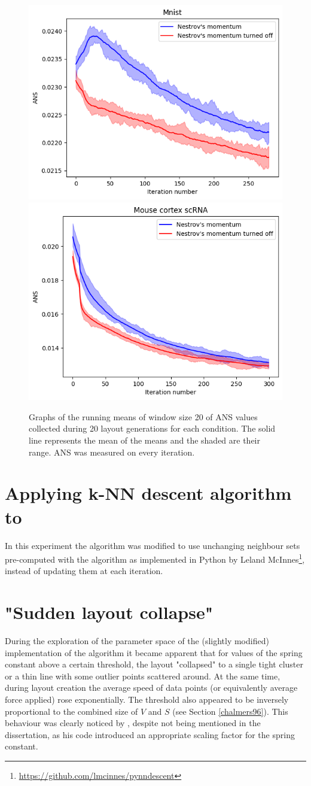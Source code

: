 \documentclass{l4proj}
\begin{document}
\begin{figure}
    \includegraphics[width = 0.45\linewidth]{images/nesterov/mnist.png}
    \includegraphics[width = 0.45\linewidth]{images/nesterov/rna.png}

    \caption{Graphs of the running means of window size 20 of ANS values collected during 20 layout generations for each condition. The solid line represents the mean of the means and the shaded are their range. ANS was measured on every iteration.}
    \label{fig:nestrov}
\end{figure}


\section{Applying k-NN descent algorithm to \cite{Chalmers96}}

In this experiment the \cite{Chalmers96} algorithm was modified to use unchanging neighbour sets pre-computed with the \citet{knnd} algorithm as implemented in Python by Leland McInnes\footnote{\url{https://github.com/lmcinnes/pynndescent}}, instead of updating them at each iteration.




\section{"Sudden layout collapse"}

During the exploration of the parameter space of the (slightly modified) \citet{2019} implementation of the \citet{Chalmers96} algorithm it became apparent that for values of the spring constant above a certain threshold, the layout "collapsed" to a single tight cluster or a thin line with some outlier points scattered around. At the same time, during layout creation the average speed of data points (or equivalently average force applied) rose exponentially. The threshold also appeared to be inversely proportional to the combined size of $V$ and $S$ (see Section \ref{chalmers96}). This behaviour was clearly noticed by \citet{2019}, despite not being mentioned in the dissertation, as his code introduced an appropriate scaling factor for the spring constant. 
\end{document}
